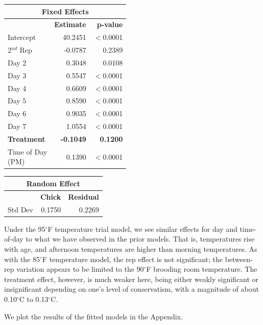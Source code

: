 \documentclass[a4paper, 10pt, titlepage]{article}
\newcommand\Tstrut{\rule{0pt}{2.9ex}}         %
\newcommand\Bstrut{\rule[-1.2ex]{0pt}{0pt}}   %
\begin{document}
\begin{table}[ht]
\centering
{} 
\begin{tabular}[t]{lrr}
 \hline
 \multicolumn{3}{c}{\textbf{Fixed Effects}}\\
 \hline
 & \textbf{Estimate} & \textbf{p-value}\Tstrut\\ 
 Intercept & 40.2451 & $<$0.0001\\
 2$^{nd}$ Rep & -0.0787 & 0.2389\\
 Day 2 & 0.3048 & 0.0108\\
 Day 3 & 0.5547 & $<$0.0001\\
 Day 4 & 0.6609 & $<$0.0001\\
 Day 5 & 0.8590 & $<$0.0001\\
 Day 6 & 0.9035 & $<$0.0001\\
 Day 7 & 1.0554 & $<$0.0001\\
 \textbf{Treatment} & \textbf{-0.1049} & \textbf{0.1200}\\
 \makecell[l]{Time of Day \\ (PM)\Bstrut} & 0.1390 & $<$0.0001\\
 \hline
\end{tabular}
\quad
\begin{tabular}[t]{lrr}
 \hline
\multicolumn{3}{c}{\textbf{Random Effect}}\\
 \hline
 & \textbf{Chick} & \textbf{Residual}\Tstrut \\ 
 Std Dev & 0.1750 & 0.2269\Bstrut\\
 \hline
\end{tabular}
\label{table:Est 95 F}
\end{table}

Under the 95$^{\circ}$F temperature trial model, we see similar effects for day and time-of-day to what we have observed in the prior models. That is, temperatures rise with age, and afternoon temperatures are higher than morning temperatures. As with the 85$^{\circ}$F temperature model, the rep effect is not significant; the between-rep variation appears to be limited to the 90$^{\circ}$F brooding room temperature. The treatment effect, however, is much weaker here, being either weakly significant or insignificant depending on one's level of conservatism, with a magnitude of about 0.10$^{\circ}$C to 0.13$^{\circ}$C. 

We plot the results of the fitted models in the Appendix.
\end{document}
